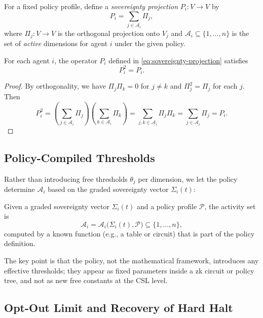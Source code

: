 \documentclass[11pt]{article}
\begin{document}
For a fixed policy profile, define a \emph{sovereignty projection} $P_i : V \to V$ by
\begin{equation}
  P_i
    = \sum_{j \in \mathcal{A}_i} \Pi_j,
  \label{eq:sovereignty-projection}
\end{equation}
where $\Pi_j : V \to V$ is the orthogonal projection onto $V_j$ and $\mathcal{A}_i \subseteq \{1,\dots,n\}$ is the set of \emph{active} dimensions for agent $i$ under the given policy.

\begin{lemma}
For each agent $i$, the operator $P_i$ defined in \eqref{eq:sovereignty-projection} satisfies
\[
  P_i^2 = P_i.
\]
\end{lemma}

\begin{proof}
By orthogonality, we have $\Pi_j \Pi_k = 0$ for $j \ne k$ and $\Pi_j^2 = \Pi_j$ for each $j$.
Then
\[
  P_i^2
  = \left( \sum_{j \in \mathcal{A}_i} \Pi_j \right)
    \left( \sum_{k \in \mathcal{A}_i} \Pi_k \right)
  = \sum_{j,k \in \mathcal{A}_i} \Pi_j \Pi_k
  = \sum_{j \in \mathcal{A}_i} \Pi_j
  = P_i.
\]
\end{proof}

\subsection{Policy-Compiled Thresholds}

Rather than introducing free thresholds $\theta_{j}$ per dimension, we let the policy determine $\mathcal{A}_i$ based on the graded sovereignty vector $\Sigma_i(t)$:

\begin{definition}
Given a graded sovereignty vector $\Sigma_i(t)$ and a policy profile $\mathcal{P}$, the activity set is
\[
  \mathcal{A}_i = \mathcal{A}_i\bigl( \Sigma_i(t), \mathcal{P} \bigr)
  \subseteq \{1,\dots,n\},
\]
computed by a known function (e.g., a table or circuit) that is part of the policy definition.
\end{definition}

The key point is that the policy, not the mathematical framework, introduces any effective thresholds; they appear as fixed parameters inside a zk circuit or policy tree, and not as new free constants at the CSL level.

\subsection{Opt-Out Limit and Recovery of Hard Halt}
\end{document}
